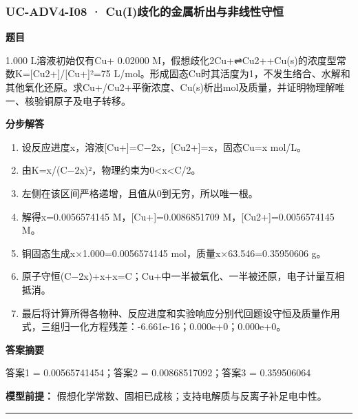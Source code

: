 \documentclass[UTF8,11pt,a4paper]{ctexart}
\begin{document}
\subsubsection*{UC-ADV4-I08 · Cu(I)歧化的金属析出与非线性守恒}
\noindent\textbf{题目}\par
1.000 L溶液初始仅有Cu+ 0.02000 M，假想歧化2Cu+⇌Cu2++Cu(s)的浓度型常数K=[Cu2+]/[Cu+]²=75 L/mol。形成固态Cu时其活度为1，不发生络合、水解和其他氧化还原。求Cu+/Cu2+平衡浓度、Cu(s)析出mol及质量，并证明物理解唯一、核验铜原子及电子转移。\par
\medskip\noindent\textbf{分步解答}
\begin{enumerate}
\item 设反应进度x，溶液[Cu+]=C−2x，[Cu2+]=x，固态Cu=x mol/L。
\item 由K=x/(C−2x)²，物理约束为0<x<C/2。
\item 左侧在该区间严格递增，且值从0到无穷，所以唯一根。
\item 解得x=0.0056574145 M，[Cu+]=0.0086851709 M，[Cu2+]=0.0056574145 M。
\item 铜固态生成x×1.000=0.0056574145 mol，质量x×63.546=0.35950606 g。
\item 原子守恒(C−2x)+x+x=C；Cu+中一半被氧化、一半被还原，电子计量互相抵消。
\item 最后将计算所得各物种、反应进度和实验响应分别代回题设守恒及质量作用式，三组归一化方程残差：-6.661e-16；0.000e+0；0.000e+0。
\end{enumerate}
\noindent\textbf{答案摘要}\par
答案1 = 0.00565741454；答案2 = 0.00868517092；答案3 = 0.359506064\par
\noindent\textbf{模型前提：}
假想化学常数、固相已成核；支持电解质与反离子补足电中性。\par
\medskip\hrule\medskip
{}
\end{document}
